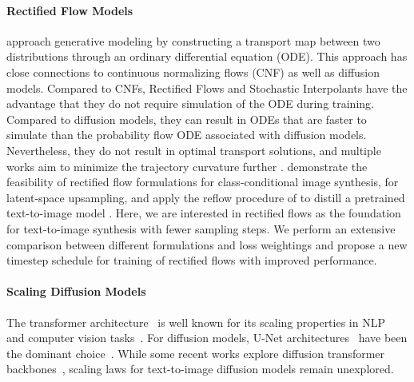 \paragraph{Rectified Flow Models}
\cite{liu2022flow,albergo2022building,lipman2023flow} approach generative modeling by
constructing a transport map between two distributions through an ordinary
differential equation (ODE). This approach has close connections to continuous
normalizing flows (CNF) \cite{Chen2018NeuralOD} as well as diffusion models.
Compared to CNFs, Rectified Flows and Stochastic Interpolants have the
advantage that they do not require simulation of the ODE during training.
Compared to diffusion models, they can result in ODEs that are faster to
simulate than the probability flow ODE \cite{Song2020ScoreBasedGM} associated
with diffusion models. Nevertheless, they do not result in optimal transport
solutions, and multiple works aim to minimize the trajectory curvature further
\cite{lee2023minimizing,alex2023improving,aramalex2023multisample}.
\cite{dao2023flow,ma2024sit} demonstrate the feasibility of rectified flow
formulations for class-conditional image synthesis, \cite{fischer2023boosting} for
latent-space upsampling, and \cite{liu2023instaflow}
apply the reflow procedure of \cite{liu2022flow} to distill a pretrained
text-to-image model \cite{Rombach_2022}. Here, we are interested in rectified
flows as the foundation for text-to-image synthesis with fewer sampling steps.
We perform an extensive comparison between different formulations and loss
weightings and propose a new timestep schedule for training of
rectified flows with improved performance.



\paragraph{Scaling Diffusion Models}
The transformer architecture~ \cite{vaswani2017attention} is well known for its scaling properties in NLP~\cite{kaplan2020scaling} and computer vision tasks~\cite{dosovitskiy2020image,zhai2022scaling}. For diffusion models, U-Net architectures~\cite{Ronneberger_2015} have been the  dominant choice~\cite{ho2020denoising,Rombach_2022,balaji2022ediffi}.
While some recent works explore diffusion transformer backbones~\cite{Peebles_2023,chen2023pixart,ma2024sit}, scaling laws for text-to-image diffusion models remain unexplored.

%

%
%
%
%
%
%
%
%
%

%
%
%
%
%
%

